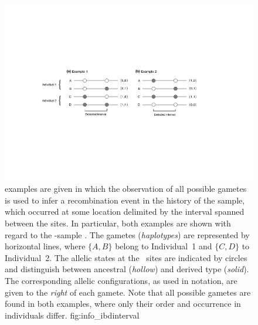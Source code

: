 

\begin{figure}[!htb]
\centering
\includegraphics[width=\textwidth]{./img/ch3/info_ibdinterval}
{ examples are given in which the observation of all  possible gametes is used to infer a recombination event in the history of the sample, which occurred at some location delimited by the interval spanned between the  sites.
In particular, both examples are shown with regard to the -sample .
The  gametes (\emph{haplotypes}) are represented by horizontal lines, where ${\{A,B\}}$ belong to Individual~1 and ${\{C,D\}}$ to Individual~2.
The allelic states at the ~sites are indicated by circles and distinguish between ancestral (\emph{hollow}) and derived type (\emph{solid}).
The corresponding allelic configurations, as used in notation, are given to the \emph{right} of each gamete.
Note that all  possible gametes are found in both examples, where only their order and occurrence in individuals differ.}
{fig:info_ibdinterval}
\end{figure}
